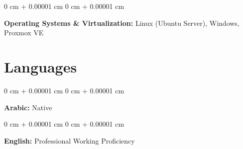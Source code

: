 \documentclass[10pt, letterpaper]{article}
\newenvironment{onecolentry}{
    \begin{adjustwidth}{
        0 cm + 0.00001 cm
    }{
        0 cm + 0.00001 cm
    }
}{
    \end{adjustwidth}
} %
\begin{document}
        \vspace{0.2 cm}

        \begin{onecolentry}
            \textbf{Operating Systems \& Virtualization:} Linux (Ubuntu Server), Windows, Proxmox VE
        \end{onecolentry}


    







    \section{Languages}

        \begin{onecolentry}
            \textbf{Arabic:} Native
        \end{onecolentry}

        \vspace{0.2 cm}

        \begin{onecolentry}
            \textbf{English:} Professional Working Proficiency
        \end{onecolentry}
\end{document}
